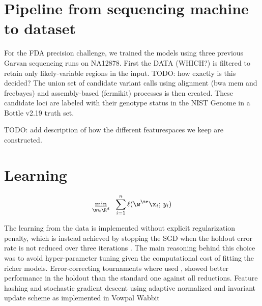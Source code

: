\documentclass{article}
\begin{document}



\section{Pipeline from sequencing machine to dataset}



For the FDA precision challenge, we trained the models using three previous Garvan sequencing runs on NA12878.
First the DATA (WHICH?) is filtered to retain only likely-variable regions in the input. TODO: how exactly is this decided?
The union set of candidate variant calls using alignment (bwa mem and freebayes) and assembly-based (fermikit) processes is then created.
These candidate loci are labeled with their genotype status in the NIST Genome in a Bottle v2.19 truth set. 

TODO: add description of how the different featurespaces we keep are constructed.

\section{Learning}

\begin{equation}
  \min_{\w \in \R^d}~~\sum_{i=1}^n\ell(\w^\tr\x_i;\,y_i) 
  \label{eqn:objective}
\end{equation}

The learning from the data is implemented without explicit regularization penalty, which is instead achieved by stopping the SGD when the holdout error rate is not reduced over three iterations \citep{hardt2015train}.
The main reasoning behind this choice was to avoid hyper-parameter tuning given the computational cost of fitting the richer models.
Error-correcting tournaments where used
\citep{beygelzimer2009error}, showed better performance in the holdout than the standard one against all reductions. 
Feature hashing and stochastic gradient descent using adaptive normalized and invariant update scheme as implemented in Vowpal Wabbit \cite{mcmahan2010adaptive, duchi2011adaptive, agarwal2014reliable} 
\end{document}

